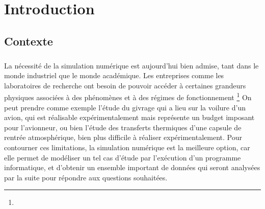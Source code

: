 \chapter{Introduction}

\section{Contexte}

	\paragraph{}
	La nécessité de la simulation numérique est aujourd'hui bien admise, tant dans le monde industriel que le monde académique.
	Les entreprises comme les laboratoires de recherche ont besoin de pouvoir accéder à certaines grandeurs physiques associées à des phénomènes et à des régimes de fonctionnement \footnote{}
	On peut prendre comme exemple l'étude du givrage qui a lieu sur la voilure d'un avion, qui est réalisable expérimentalement mais représente un budget imposant pour l’avionneur, ou bien l'étude des transferts thermiques d'une capsule de rentrée atmosphérique, bien plus difficile à réaliser expérimentalement.
	Pour contourner ces limitations, la simulation numérique est la meilleure option, car elle permet de modéliser un tel cas d'étude par l’exécution d'un programme informatique, et d'obtenir un ensemble important de données qui seront analysées par la suite pour répondre aux questions souhaitées.

